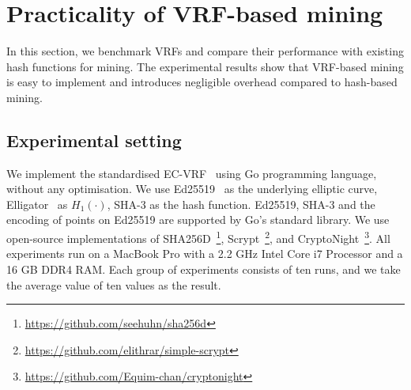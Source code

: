 \section{Practicality of VRF-based mining}
\label{sec:practicality}

In this section, we benchmark VRFs and compare their performance with existing hash functions for mining.
The experimental results show that VRF-based mining is easy to implement and introduces negligible overhead compared to hash-based mining.

\subsection{Experimental setting}

We implement the standardised EC-VRF~\cite{goldberg2017draft} using Go programming language, without any optimisation.
We use Ed25519~\cite{bernstein2012high} as the underlying elliptic curve, Elligator~\cite{bernstein2013elligator} as $H_1(\cdot)$, SHA-3 as the hash function.
Ed25519, SHA-3 and the encoding of points on Ed25519 are supported by Go's standard library.
We use open-source implementations of SHA256D~\footnote{\url{https://github.com/seehuhn/sha256d}}, Scrypt~\footnote{\url{https://github.com/elithrar/simple-scrypt}}, and CryptoNight~\footnote{\url{https://github.com/Equim-chan/cryptonight}}.
All experiments run on a MacBook Pro with a 2.2 GHz Intel Core i7 Processor and a 16 GB DDR4 RAM.
Each group of experiments consists of ten runs, and we take the average value of ten values as the result.


